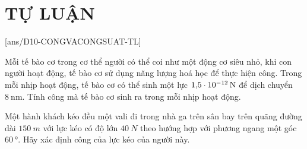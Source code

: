 \section{TỰ LUẬN}
\setcounter{ex}{0}
[ans/D10-CONGVACONGSUAT-TL]
\begin{ex}
	Mỗi tế bào cơ trong cơ thể người có thể coi như một động cơ siêu nhỏ, khi con người hoạt động, tế bào cơ sử dụng năng lượng hoá học để thực hiện công. Trong mỗi nhịp hoạt động, tế bào cơ có thể sinh một lực $\SI{1.5E-12}{\newton}$ để dịch chuyển $\SI{8}{\nano\meter}$. Tính công mà tế bào cơ sinh ra trong mỗi nhịp hoạt động.	
\end{ex}
\begin{ex}
	Một hành khách kéo đều một vali đi trong nhà ga trên sân bay trên quãng đường dài $\SI{150}{m}$ với lực kéo có độ lớn $\SI{40}{N}$ theo hướng hợp với phương ngang một góc $\SI{60}{\degree}$. Hãy xác định công của lực kéo của người này.
\end{ex}
